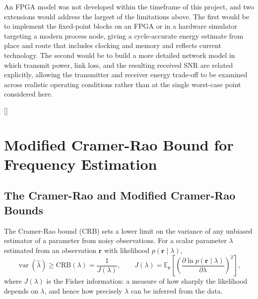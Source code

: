\documentclass[12pt,a4paper]{report}
\begin{document}
An FPGA model was not developed within the timeframe of this project, and two extensions would address the largest of the limitations above. The first would be to implement the fixed-point blocks on an FPGA or in a hardware simulator targeting a modern process node, giving a cycle-accurate energy estimate from place and route that includes clocking and memory and reflects current technology. The second would be to build a more detailed network model in which transmit power, link loss, and the resulting received SNR are related explicitly, allowing the transmitter and receiver energy trade-off to be examined across realistic operating conditions rather than at the single worst-case point considered here.

\renewcommand*{\bibfont}{\footnotesize}
\setlength{\bibitemsep}{0pt}
[\bibname]{%
    \clearpage
    \par\vspace{0.8em}%
    \enlargethispage{3\baselineskip}%
}
\printbibliography[heading=compact]

\appendix


\chapter{Modified Cramer-Rao Bound for Frequency Estimation}\label{appendix:mcrb}
\section{The Cramer-Rao and Modified Cramer-Rao Bounds}
The Cramer-Rao bound (CRB) sets a lower limit on the variance of any unbiased estimator of a parameter from noisy observations. For a scalar parameter $\lambda$ estimated from an observation $\mathbf{r}$ with likelihood $p(\mathbf{r}\mid\lambda)$,
\begin{equation}
    \operatorname{var}(\hat\lambda) \ge \mathrm{CRB}(\lambda) = \frac{1}{J(\lambda)}, \qquad J(\lambda) = \mathbb{E}_{\mathbf r}\!\left[\left(\frac{\partial \ln p(\mathbf r\mid\lambda)}{\partial\lambda}\right)^2\right],
\end{equation}
where $J(\lambda)$ is the Fisher information: a measure of how sharply the likelihood depends on $\lambda$, and hence how precisely $\lambda$ can be inferred from the data.
\end{document}
